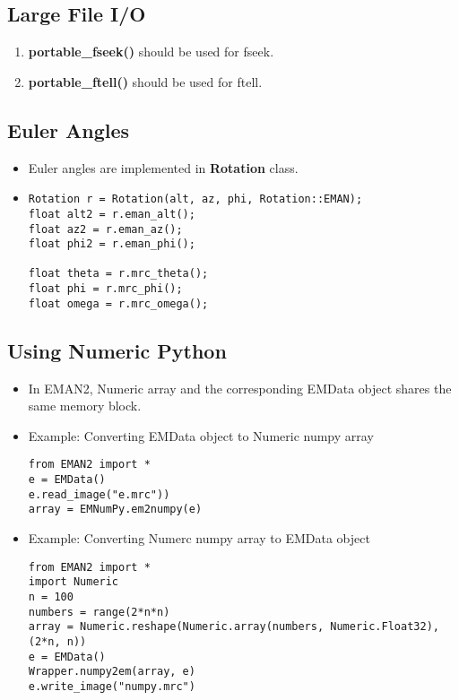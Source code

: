     \subsection{Large File I/O} 
    \begin{enumerate}
      \item 
	\textbf{portable\_fseek()} should be used for fseek.
      \item
	\textbf{portable\_ftell()} should be used for ftell.
    \end{enumerate}

    \subsection{Euler Angles} 
    \begin{itemize}
      \item
	Euler angles are implemented in \textbf{Rotation} class.
      \item
	\begin{verbatim}Rotation r = Rotation(alt, az, phi, Rotation::EMAN);
float alt2 = r.eman_alt();
float az2 = r.eman_az();
float phi2 = r.eman_phi();

float theta = r.mrc_theta();
float phi = r.mrc_phi();
float omega = r.mrc_omega();\end{verbatim}
    \end{itemize}

    \subsection{Using Numeric Python} 
    \begin{itemize}
      \item
	In EMAN2,  Numeric array and the corresponding EMData object shares the same memory block.
      \item
	Example: Converting EMData object to Numeric numpy array
	\begin {verbatim}from EMAN2 import *
e = EMData()
e.read_image("e.mrc"))
array = EMNumPy.em2numpy(e)\end{verbatim}
      \item
	Example: Converting Numerc numpy array to EMData object
	\begin{verbatim}from EMAN2 import *
import Numeric
n = 100
numbers = range(2*n*n)
array = Numeric.reshape(Numeric.array(numbers, Numeric.Float32), (2*n, n))
e = EMData()
Wrapper.numpy2em(array, e)
e.write_image("numpy.mrc")\end{verbatim}
    \end{itemize}

